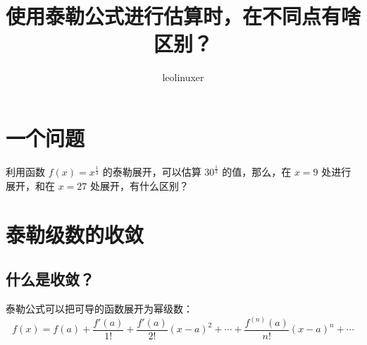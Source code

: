\documentclass[12pt]{article}
\title{使用泰勒公式进行估算时，在不同点有啥区别？\cite{Taylor_Expansion_By_Different_Value}}
\author{leolinuxer}
\begin{document}
\maketitle

\section{一个问题}
利用函数 $f(x) = x^{\frac{1}{3}}$ 的泰勒展开，可以估算 $30^\frac{1}{3}$ 的值，那么，在 $x = 9$ 处进行展开，和在 $x=27$ 处展开，有什么区别？

\section{泰勒级数的收敛}
\subsection{什么是收敛？}
泰勒公式可以把可导的函数展开为幂级数：
$$
f(x) = f(a) + \frac{f'(a)}{1!} + \frac{f'(a)}{2!}(x-a)^2 + \cdots + \frac{f^(n)(a)}{n!}(x-a)^n + \cdots 
$$
\end{document}
